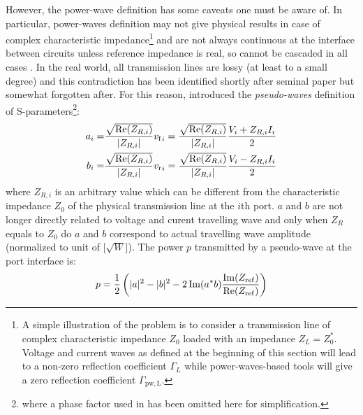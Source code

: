 However, the power-wave definition has some caveats one must be aware of. In particular, power-waves definition may not give physical results in case of complex characteristic impedance\footnote{A simple illustration of the problem is to consider a transmission line of complex characteristic impedance $Z_0$ loaded with an impedance $Z_L=Z_0^*$. Voltage and current waves as defined at the beginning of this section will lead to a non-zero reflection coefficient $\Gamma_L$ while power-waves-based tools will give a zero reflection coefficient $\Gamma_\mathrm{pw,L}$\cite{amakawa2016}.} and are not always continuous at the interface between circuits unless reference impedance is real, so cannot be cascaded in all cases . In the real world, all transmission lines are lossy (at least to a small degree) and this contradiction has been identified shortly after  seminal paper  but somewhat forgotten after. For this reason,  introduced the \textit{pseudo-waves} definition of S-parameters\footnote{where a phase factor used in \cite{marks1992} has been omitted here for simplification.}:
\begin{subequations}
	\begin{align}
		a_i =& \frac{\sqrt{\Re(Z_{R,i})}}{|Z_{R,i}|} {v_{\mathrm{f}}}_i 
		= \frac{\sqrt{\Re(Z_{R,i})}}{|Z_{R,i}|} \frac{V_i + Z_{R,i} I_i}{2} \\
		b_i =& \frac{\sqrt{\Re(Z_{R,i})}}{|Z_{R,i}|} {v_{\mathrm{r}}}_i 
= \frac{\sqrt{\Re(Z_{R,i})}}{|Z_{R,i}|} \frac{V_i - Z_{R,i} I_i}{2}		
	\end{align}
\end{subequations}
where $Z_{R,i}$ is an arbitrary value which can be different from the characteristic impedance $Z_0$ of the physical transmission line at the $i$th port. $a$ and $b$ are not longer directly related to voltage and curent travelling wave and only when $Z_{R}$ equals to $Z_0$ do $a$ and $b$ correspond to actual travelling wave amplitude (normalized to unit of [$\sqrt{\si{W}}$]). The power $p$ transmitted by a pseudo-wave at the port interface is:
\begin{equation}
p = \frac{1}{2} \left(|a|^2 - |b|^2 - 2\Im(a^* b) \frac{\Im({Z_{\mathrm{ref}}})}{\Re({Z_{\mathrm{ref}}})} \right)
\end{equation}

